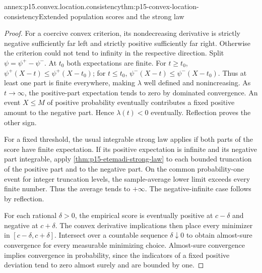 \begin{annexitem}{annex:p15.convex.location.consistency}{thm:p15-convex-location-consistency}{Extended population scores and the strong law}
\begin{proof}
For a coercive convex criterion, its nondecreasing derivative is
strictly negative sufficiently far left and strictly positive
sufficiently far right. Otherwise the criterion could not tend
to infinity in the respective direction.
Split \(\psi=\psi^+-\psi^-\).
At \(t_0\) both expectations are finite.
For \(t\geq t_0\), \(\psi^+(X-t)\leq\psi^+(X-t_0)\);
for \(t\leq t_0\), \(\psi^-(X-t)\leq\psi^-(X-t_0)\).
Thus at least one part is finite everywhere, making \(\lambda\)
well defined and nonincreasing.
As \(t\to\infty\), the positive-part expectation tends to zero by
dominated convergence. An event \(X\leq M\) of positive
probability eventually contributes a fixed positive amount to the
negative part. Hence \(\lambda(t)<0\) eventually.
Reflection proves the other sign.

For a fixed threshold, the usual integrable strong law applies if
both parts of the score have finite expectation.
If its positive expectation is infinite and its negative part integrable,
apply \cref{thm:p15-etemadi-strong-law} to each bounded truncation
of the positive part and to the negative part.
On the common probability-one event for integer truncation levels,
the sample-average lower limit exceeds every finite number.
Thus the average tends to \(+\infty\). The negative-infinite case
follows by reflection.

For each rational \(\delta>0\), the empirical score is eventually
positive at \(c-\delta\) and negative at \(c+\delta\).
The convex derivative implications then place every minimizer in
\([c-\delta,c+\delta]\). Intersect over a countable sequence
\(\delta\downarrow0\) to obtain almost-sure convergence for every
measurable minimizing choice. Almost-sure convergence implies
convergence in probability, since the indicators of a fixed positive
deviation tend to zero almost surely and are bounded by one.
\end{proof}
\end{annexitem}

